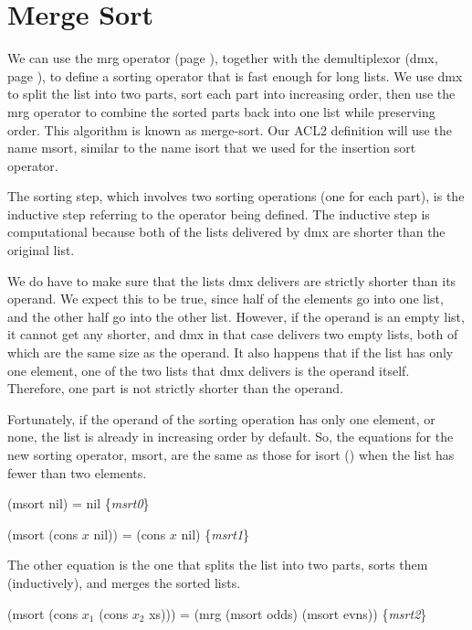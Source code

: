 \section{Merge Sort}
\label{sec:msort}

We can use the mrg operator (page \pageref{defun:mrg}),
together with the demultiplexor (dmx, page \pageref{defun:dmx}),
to define a sorting operator that is fast enough for long lists.
We use dmx to split the list into two parts,
sort each part into increasing order, then use the mrg operator to
combine the sorted parts back into one list while preserving order.
This algorithm is known as merge-sort. Our ACL2 definition
will use the name msort, similar to the name isort that we used
for the insertion sort operator.

The sorting step, which involves two sorting operations (one for each part),
is the inductive step referring to the operator being defined.
The inductive step is computational because both of the lists delivered by dmx
are shorter than the original list.

We do have to make sure that the lists dmx delivers are strictly
shorter than its operand. We expect this to be true, since half
of the elements go into one list, and the other half go into the other list.
However, if the operand is an empty list, it cannot get any shorter,
and dmx in that case delivers two empty lists,
both of which are the same size as the operand.
It also happens that if the list has only one element,
one of the two lists that dmx delivers is the operand itself.
Therefore, one part is not strictly shorter than the operand.

Fortunately, if the operand of the sorting operation has
only one element, or none, the list is already in increasing order
by default. So, the equations for the new sorting operator, msort,
are the same as those for isort (\pageref{eq:isrt0})
when the list has fewer than two elements.

\label{eq:msrt0}
\hspace{1cm} (msort nil) = nil \hfill \{\emph{msrt0}\}

\label{eq:msrt1}
\hspace{1cm} (msort (cons $x$ nil)) = (cons $x$ nil) \hfill \{\emph{msrt1}\}

The other equation is the one that splits the list into two parts,
sorts them (inductively), and merges the sorted lists.

\label{eq:msrt2}
\hspace{1cm} (msort (cons $x_1$ (cons $x_2$ xs))) = (mrg (msort odds) (msort evns)) \hfill \{\emph{msrt2}\}

